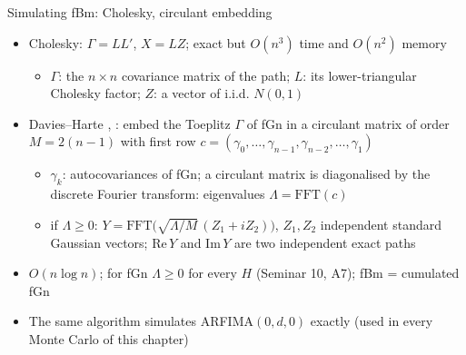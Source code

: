 \begin{frame}{Simulating fBm: Cholesky, circulant embedding}
\itemsize{\small}
\begin{itemize}
    \item Cholesky: $\Gamma = LL'$, $X = LZ$; exact but $O(n^3)$ time and $O(n^2)$ memory
    \begin{itemize}
        \item $\Gamma$: the $n \times n$ covariance matrix of the path; $L$: its lower-triangular Cholesky factor; $Z$: a vector of i.i.d. $N(0, 1)$
    \end{itemize}
    \item Davies--Harte , : embed the Toeplitz $\Gamma$ of fGn in a circulant matrix of order $M = 2(n - 1)$ with first row $c = (\gamma_0, \dots, \gamma_{n-1}, \gamma_{n-2}, \dots, \gamma_1)$
    \begin{itemize}
        \item $\gamma_k$: autocovariances of fGn; a circulant matrix is diagonalised by the discrete Fourier transform: eigenvalues $\Lambda = \mathrm{FFT}(c)$
        \item if $\Lambda \ge 0$: $Y = \mathrm{FFT}\big(\sqrt{\Lambda/M}\,(Z_1 + iZ_2)\big)$, $Z_1, Z_2$ independent standard Gaussian vectors; $\mathrm{Re}\,Y$ and $\mathrm{Im}\,Y$ are two independent exact paths
    \end{itemize}
    \item $O(n\log n)$; for fGn $\Lambda \ge 0$ for every $H$ (Seminar 10, A7); fBm = cumulated fGn
    \item The same algorithm simulates ARFIMA$(0,d,0)$ exactly (used in every Monte Carlo of this chapter)
\end{itemize}
\end{frame}

